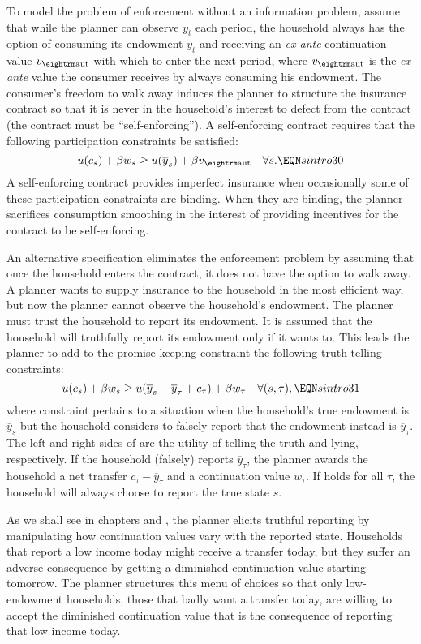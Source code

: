 To model  the problem
of enforcement without an information problem, assume that while the
planner can observe $y_t$ each period, the household always has the
option of consuming its endowment $y_t$ and receiving an {\it ex ante\/}
 continuation
value $v_{\rm aut}$ with which to enter the next period, where  $v_{\rm aut}$
is the {\it ex ante\/} value the consumer receives by always consuming
his endowment.  The consumer's freedom  to walk away induces the planner
to structure the insurance contract so that   it is never in the
household's interest to defect from the contract (the contract must be ``self-enforcing'').
A self-enforcing contract
requires that the following participation constraints be satisfied:
$$ u(c_s) + \beta w_s \geq u(\overline y_s) + \beta v_{\rm aut}
  \quad \forall s.  \EQN sintro30 $$
A self-enforcing  contract provides imperfect insurance when
occasionally  some of these participation constraints are binding.
When they are binding, the planner sacrifices consumption smoothing
in the interest of
providing incentives for the contract to be self-enforcing.

An alternative specification eliminates
the enforcement problem by assuming
that once the household enters the contract, it does not have the option
 to walk away.
A planner wants to supply insurance to the household in the most efficient
way, but now the planner cannot observe the household's endowment.
The planner must trust the household to report its endowment.  It is assumed
that the household will truthfully report its endowment only if
it wants to.
This leads the planner
to add to the promise-keeping constraint  the
 following truth-telling constraints:
$$  u(c_s) + \beta w_s \geq u(\overline y_s - \overline y_\tau + c_\tau) + \beta w_\tau
 \quad \forall (s,\tau), \EQN sintro31 $$
where constraint  pertains to a situation when the household's
true endowment is $\overline y_s$ but the household considers
to falsely report that the endowment instead is $\overline y_\tau$.
The left  and right  sides of  are the utility
of telling the truth and lying, respectively. If the household
(falsely) reports $\overline y_\tau$, the planner awards the household
a net transfer $c_\tau-\overline y_\tau$ and a continuation value
$w_\tau$.
If  holds for all $\tau$, the household will always choose to report
the true state $s$.

As we shall see in chapters  and ,
the planner elicits truthful reporting by manipulating
how continuation values vary with the reported state.   Households
that report a low income today might receive a transfer today, but
they suffer an adverse  consequence by getting a diminished continuation
value starting tomorrow.  The planner structures this
menu of choices so that only
low-endowment households, those that badly want a transfer today, are willing
to accept the diminished continuation value that  is the consequence
of reporting that low income today.


